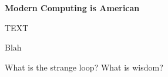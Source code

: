 \begin{tcolorbox}[breakable, enhanced, colback=textbook-blue, sharp corners]
	\vspace{3mm}
	\begin{center}
		\textbf{Modern Computing is American}
	\end{center}
	TEXT
	\vspace{3mm}
\end{tcolorbox}
\vspace{2\baselineskip}

Blah \\


\parbreak

What is the strange loop? What is wisdom?




